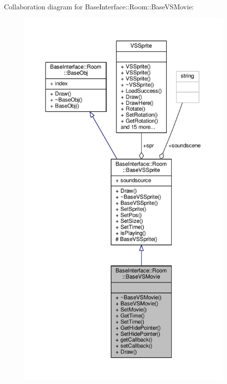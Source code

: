 Collaboration diagram for Base\+Interface\+:\+:Room\+:\+:Base\+V\+S\+Movie\+:
\nopagebreak
\begin{figure}[H]
\begin{center}
\leavevmode
\includegraphics[height=550pt]{d9/de0/classBaseInterface_1_1Room_1_1BaseVSMovie__coll__graph}
\end{center}
\end{figure}

